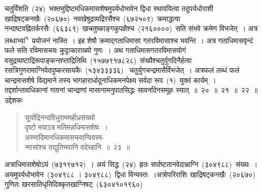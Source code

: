 \documentclass[11pt, openany]{book}
\begin{document}
\indent
चतुर्विंशति~(२४)~भक्तमुद्दिष्टमधिकमासशेषमुपर्यधोभावेन द्विधा स्थापयित्वा तदुपर्यधोराशी खाद्रिषट्कनखैः~(२०६७०)~नवखेषुद्रव्यद्रिरसैश्च~(६७२५०९)~क्रमाद्धत्वा नन्दाष्टवह्नितर्करसैः~(६६३८९)~खचतुष्काङ्गकुपक्षैश्च~(२१६००००)~सति संभवे क्रमेण विभजेत्~। अत्र लब्धाभ्यां\textsuperscript{१}\ प्रयोजनं नास्ति~। इह शेषौ क्रमाद्गताधिमासा गतरविमासाश्च भवन्ति~। अत्र गताधिमासवृन्दं फले सति रविमासचयः कुट्टाकाराख्यो गुणः~। अथ गताधिमासगतरविमासयोगं वसुद्रव्यष्टाद्रिरूपाङ्कन्सप्ताद्रितिथि~(१५७७९१७८२८)~संख्यैश्चतुर्युगदिनैर्हत्वा रसत्रिगुणरामाग्निवेदपुष्करसायकैः~(५३४३३३३६)~ चतुर्युगचन्द्रमासैर्विभजेत्~। अत्रफलं लब्धं फलं चान्द्रमासशेषे विद्यमाने तस्य भागहारार्धादूनाधिकमनपेक्ष्य सर्वदा रूप~(१)~युक्तं कार्यम्~। तद्दर्शान्तावधिकानां गतानां चान्द्राणां मासानामनुपातसिद्धः सावनदिनसमूहः स्यात्~॥~२०~॥~२१~॥~२२~॥\\
उद्देशकः\textendash
\begin{quote}
{\ku सूर्याद्रिनन्दविधुराममहीध्रसंख्यो\\
दृष्टो मयाऽत्र मतिमन्नधिमासशेषः~।\\
अस्मादिमानधिकमासचयान्विवस्व-\\
न्मासांश्च तद्युतिभवानि वदेरहानि~॥~२३~॥}
\end{quote}

\indent
अत्राधिमासशेषोऽयं~(७३१९७१२)~। अयं सिद्ध~(२४)~हृतः सर्पाष्टतानवेदाभ्राग्नि~(३०४९८८)~संख्यः~। अयमुपर्यधोभावेन~(३०४९८८ । ३०४९८८)~द्विधा विन्यस्तः~।अत्रोपरिराशिः खाद्रिषट्कनखैः~(२०६७०)~ गुणितः खरसातिधृतिदिक्कृतखाग्निषट्~(६३०४१०१९६०)~

\end{document}
